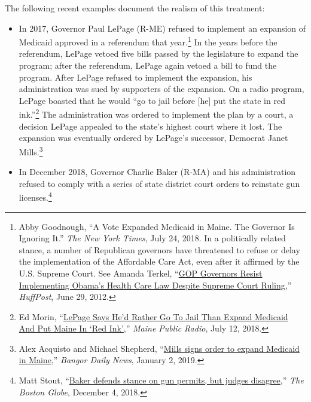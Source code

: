 \documentclass[12pt]{article}
\begin{document}
The following recent examples document the realism of this treatment:

\begin{itemize}

\item In 2017, Governor Paul LePage (R-ME) refused to implement an expansion of Medicaid approved in a referendum that year.\footnote{Abby Goodnough, ``A Vote Expanded Medicaid in Maine. The Governor Is Ignoring It.'' \emph{The New York Times}, July 24, 2018. In a politically related stance, a number of Republican governors have threatened to refuse or delay the implementation of the Affordable Care Act, even after it affirmed by the U.S. Supreme Court. See Amanda Terkel, ``\href{https://www.huffingtonpost.com/2012/06/29/gop-governors-obama-health-care_n_1637456.html}{GOP Governors Resist Implementing Obama’s Health Care Law Despite Supreme Court Ruling},'' \emph{HuffPost}, June 29, 2012.} In the years before the referendum, LePage vetoed five bills passed by the legislature to expand the program; after the referendum, LePage again vetoed a bill to fund the program. After LePage refused to implement the expansion, his administration was sued by supporters of the expansion. On a radio program, LePage boasted that he would ``go to jail before [he] put the state in red ink.''\footnote{Ed Morin, ``\href{https://www.mainepublic.org/post/lepage-says-hed-rather-go-jail-expand-medicaid-and-put-maine-red-ink}{LePage Says He'd Rather Go To Jail Than Expand Medicaid And Put Maine In `Red Ink'},'' \emph{Maine Public Radio}, July 12, 2018.} The administration was ordered to implement the plan by a court, a decision LePage appealed to the state's highest court where it lost. The expansion was eventually ordered by LePage's successor, Democrat Janet Mills.\footnote{Alex Acquisto and Michael Shepherd, ``\href{https://bangordailynews.com/2019/01/03/politics/mills-signs-order-to-expand-medicaid-in-maine/}{Mills signs order to expand Medicaid in Maine},'' \emph{Bangor Daily News}, January 2, 2019.}

\item In December 2018, Governor Charlie Baker (R-MA) and his administration refused to comply with a series of state district court orders to reinstate gun licenses.\footnote{Matt Stout, ``\href{https://www.bostonglobe.com/metro/2018/12/03/baker-defends-stance-gun-permits-but-judges-differ/XYAoEOcX12RIM8DmgeoC8K/story.html}{Baker defends stance on gun permits, but judges disagree},'' \emph{The Boston Globe}, December 4, 2018.}


\end{itemize}
\end{document}
